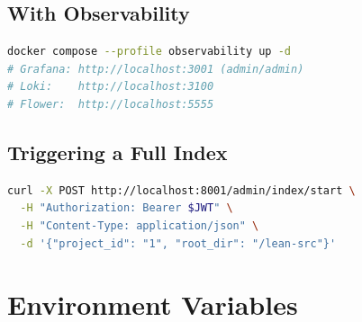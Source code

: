\documentclass[11pt,a4paper]{article}
\begin{document}
\subsection{With Observability}

\begin{lstlisting}[language=bash, caption={Full stack with observability}]
docker compose --profile observability up -d
# Grafana: http://localhost:3001 (admin/admin)
# Loki:    http://localhost:3100
# Flower:  http://localhost:5555
\end{lstlisting}

\subsection{Triggering a Full Index}

\begin{lstlisting}[language=bash, caption={Index a Lean project}]
curl -X POST http://localhost:8001/admin/index/start \
  -H "Authorization: Bearer $JWT" \
  -H "Content-Type: application/json" \
  -d '{"project_id": "1", "root_dir": "/lean-src"}'
\end{lstlisting}

\section{Environment Variables}
\end{document}
